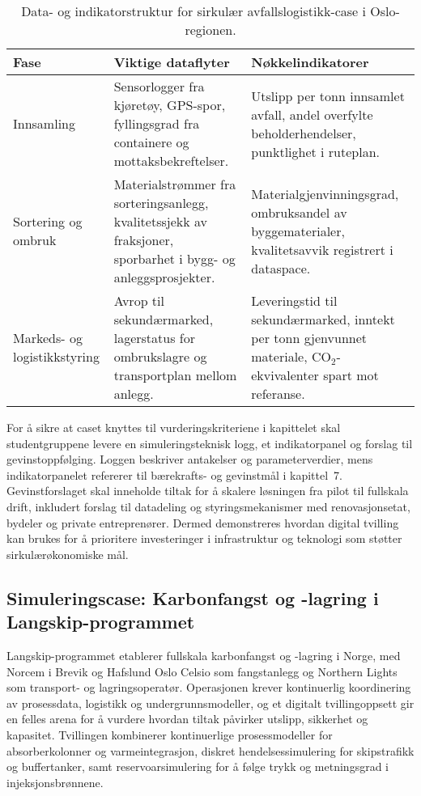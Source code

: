 \begin{table}[htbp]
    \centering
    \begin{tabular}{p{}p{}p{}}
        \toprule
        \textbf{Fase} & \textbf{Viktige dataflyter} & \textbf{Nøkkelindikatorer}\\
        \midrule
        Innsamling & Sensorlogger fra kjøretøy, GPS-spor, fyllingsgrad fra containere og mottaksbekreftelser. & Utslipp per tonn innsamlet avfall, andel overfylte beholderhendelser, punktlighet i ruteplan.\\
        Sortering og ombruk & Materialstrømmer fra sorteringsanlegg, kvalitetssjekk av fraksjoner, sporbarhet i bygg- og anleggsprosjekter. & Materialgjenvinningsgrad, ombruksandel av byggematerialer, kvalitetsavvik registrert i dataspace.\\
        Markeds- og logistikkstyring & Avrop til sekundærmarked, lagerstatus for ombrukslagre og transportplan mellom anlegg. & Leveringstid til sekundærmarked, inntekt per tonn gjenvunnet materiale, CO$_2$-ekvivalenter spart mot referanse.\\
        \bottomrule
    \end{tabular}
    \caption{Data- og indikatorstruktur for sirkulær avfallslogistikk-case i Oslo-regionen.}
    \label{tab:kap04-avfall-simulering}
\end{table}

For å sikre at caset knyttes til vurderingskriteriene i kapittelet skal studentgruppene levere en simuleringsteknisk logg, et indikatorpanel og forslag til gevinstoppfølging. Loggen beskriver antakelser og parameterverdier, mens indikatorpanelet refererer til bærekrafts- og gevinstmål i kapittel~7. Gevinstforslaget skal inneholde tiltak for å skalere løsningen fra pilot til fullskala drift, inkludert forslag til datadeling og styringsmekanismer med renovasjonsetat, bydeler og private entreprenører. Dermed demonstreres hvordan digital tvilling kan brukes for å prioritere investeringer i infrastruktur og teknologi som støtter sirkulærøkonomiske mål.

\subsection{Simuleringscase: Karbonfangst og -lagring i Langskip-programmet}
Langskip-programmet etablerer fullskala karbonfangst og -lagring i Norge, med Norcem i Brevik og Hafslund Oslo Celsio som fangstanlegg og Northern Lights som transport- og lagringsoperatør.\citep{oed2023langskip,northernlights2024readiness} Operasjonen krever kontinuerlig koordinering av prosessdata, logistikk og undergrunnsmodeller, og et digitalt tvillingoppsett gir en felles arena for å vurdere hvordan tiltak påvirker utslipp, sikkerhet og kapasitet. Tvillingen kombinerer kontinuerlige prosessmodeller for absorberkolonner og varmeintegrasjon, diskret hendelsessimulering for skipstrafikk og buffertanker, samt reservoarsimulering for å følge trykk og metningsgrad i injeksjonsbrønnene.

